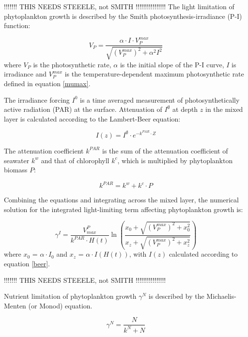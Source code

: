 \documentclass[template.tex]{subfiles}
\begin{document}


!!!!!!! THIS NEEDS STEEELE, not SMITH !!!!!!!!!!!!!!!!
The light limitation of phytoplankton growth is described by the Smith photosynthesis-irradiance (P-I) function:

\begin{equation}
    V_P = \frac{\alpha \cdot I \cdot V^{max}_P}{\sqrt{(V^{max}_P)^2 + \alpha^2 I^2}}
\end{equation}
where $V_P$ is the photosynthetic rate, $\alpha$ is the initial slope of the P-I curve, $I$ is irradiance and $V^{max}_P$ is the temperature-dependent maximum photosynthetic rate defined in equation \eqref{mumax}.


The irradiance forcing $I^0$ is a time averaged measurement of photosynthetically active radiation (PAR) at the surface. Attenuation of $I^\emptyset$ at depth $z$ in the mixed layer is calculated according to the Lambert-Beer equation:

\begin{equation}
    I(z) = I^\emptyset \cdot e^{-k^{PAR} \cdot Z} \label{beer}
\end{equation}

The attenuation coefficient $k^{PAR}$ is the sum of the attenuation coefficient of seawater $k^w$ and that of chlorophyll $k^c$, which is multiplied by phytoplankton biomass $P$:

\begin{equation}
    k^{PAR} = k^w + k^c \cdot P
\end{equation}

Combining the equations and integrating across the mixed layer, the numerical solution for the integrated light-limiting term affecting phytoplankton growth is:

\begin{equation}
    \gamma^I = \frac{V^P_{max}}{k^{PAR} \cdot H(t)} \ln{ \left( \frac{ x_0+\sqrt{(V^{max}_P)^2+x_0^2} }{ x_z+\sqrt{(V^{max}_P)^2+x_z^2} } \right)}
\end{equation}
where $x_0$ = $\alpha \cdot I_0$ and $x_z$ = $\alpha \cdot I(H(t))$, with $I(z)$ calculated according to equation \eqref{beer}.

!!!!!!! THIS NEEDS STEEELE, not SMITH !!!!!!!!!!!!!!!!

Nutrient limitation of phytoplankton growth $\gamma^N$ is described by the Michaelis-Menten (or Monod) equation.

\begin{equation}
    \gamma^N = \frac{N}{k^N + N}
\end{equation}
\end{document}
